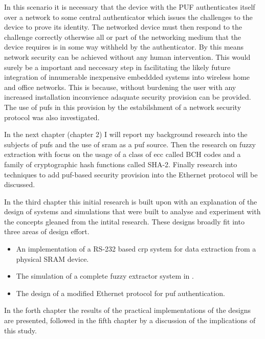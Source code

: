 In this scenario it is necessary that the device with the PUF authenticates
itself over a network to some central authenticator which issues the challenges 
to the device to prove its identity.
The networked device must then respond to the challenge correctly otherwise all
or part of the networking medium that the device requires is in some way
withheld by the authenticator.
By this means network security can be achieved without any human intervention.
This would surely be a important and neccesary
step in facilitating the likely future integration of innumerable inexpensive
embeddded systems into wireless home and office networks.
This is because, without burdening the user with any increased installation 
inconvience adaquate security provision can be provided.
The use of \glspl{puf} in this provision by the estabilshment of a network
security protocol was also investigated.

In the next chapter (chapter 2) I will report my background research into the
subjects of \glspl{puf} and the use of \gls{sram} as a \gls{puf} source. Then
the research on fuzzy extraction with focus on the usage of a class of \gls{ecc}
called BCH codes and a family of cryptographic hash functions called SHA-2. Finally
research into techniques to add \gls{puf}-based security provision into the
Ethernet protocol will be discussed.

In the third chapter this initial research is built upon with an explanation of
the design of systems and simulations that were built to analyse and experiment
with the concepts gleaned from the intital research. These designs broadly fit
into three areas of design effort.
\begin{itemize}
\item An implementation of a RS-232 based \gls{crp} system for data extraction from a
physical SRAM device.
\item The simulation of a complete fuzzy extractor system in \matlab.
\item The design of a modified Ethernet protocol for \gls{puf} authentication.
\end{itemize}

In the forth chapter the results of the practical implementations of the designs
are presented, followed in the fifth chapter by a discussion of the implications
of this study.




